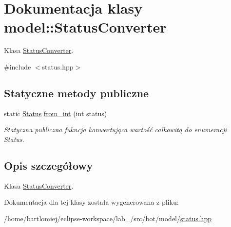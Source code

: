 \hypertarget{classmodel_1_1StatusConverter}{}\section{Dokumentacja klasy model\+:\+:Status\+Converter}
\label{classmodel_1_1StatusConverter}


Klasa \hyperlink{classmodel_1_1StatusConverter}{Status\+Converter}.  




{\ttfamily \#include $<$status.\+hpp$>$}

\subsection*{Statyczne metody publiczne}
\begin{DoxyCompactItemize}
\item 
\mbox{\label{classmodel_1_1StatusConverter_acbb7e3435014ae1225cc407686c52d02}} 
static \hyperlink{status_8hpp_a822822ece62ee330ee656034849df887}{Status} \hyperlink{classmodel_1_1StatusConverter_acbb7e3435014ae1225cc407686c52d02}{from\+\_\+int} (int status)
\begin{DoxyCompactList}\small\item\em Statyczna publiczna fukncja konwertująca wartość całkowitą do enumeracji Status. \end{DoxyCompactList}\end{DoxyCompactItemize}


\subsection{Opis szczegółowy}
Klasa \hyperlink{classmodel_1_1StatusConverter}{Status\+Converter}. 

Dokumentacja dla tej klasy została wygenerowana z pliku\+:\begin{DoxyCompactItemize}
\item 
/home/bartlomiej/eclipse-\/workspace/lab\+\_/src/bot/model/\hyperlink{status_8hpp}{status.\+hpp}\end{DoxyCompactItemize}
